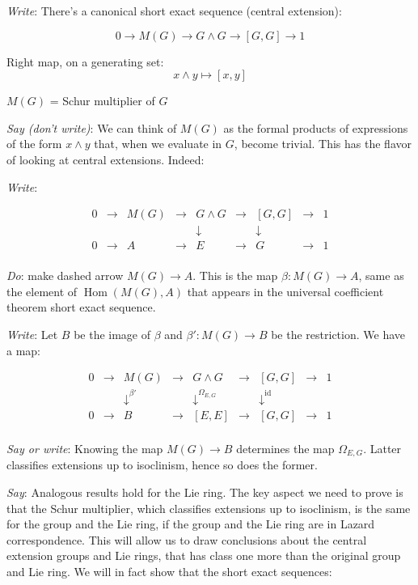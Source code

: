 \documentclass[10pt]{amsart}
\begin{document}
{\em Write}: There's a canonical short exact sequence (central extension):

$$0 \to M(G) \to G \wedge G \to [G,G] \to 1$$

Right map, on a generating set: $$x \wedge y \mapsto [x,y]$$

$M(G)$ = Schur multiplier of $G$

{\em Say (don't write)}: We can think of $M(G)$ as the formal products
of expressions of the form $x \wedge y$ that, when we evaluate in $G$,
become trivial. This has the flavor of looking at central extensions. Indeed:

{\em Write}: 

$$\begin{array}{ccccccccc}
0 & \to & M(G) & \to & G \wedge G & \to & [G,G] & \to & 1\\
 &&               && \downarrow     &&\downarrow&& \\
0 & \to & A & \to & E & \to & G & \to & 1\\
\end{array}$$

{\em Do}: make dashed arrow $M(G) \to A$.  This is the map $\beta:M(G)
\to A$, same as the element of $\operatorname{Hom}(M(G),A)$ that
appears in the universal coefficient theorem short exact sequence.

{\em Write}: Let $B$ be the image of $\beta$ and $\beta': M(G) \to B$
be the restriction. We have a map:

$$\begin{array}{ccccccccc}
0 & \to & M(G) & \to & G \wedge G & \to & [G,G] & \to & 1\\
 &&   \downarrow^{\beta'}  &&  \downarrow^{\Omega_{E,G}}     && \downarrow^{\text{id}} && \\
0 & \to & B &\to & [E,E] & \to & [G,G] & \to & 1\\
\end{array}$$

{\em Say or write}: Knowing the map $M(G) \to B$ determines the map
$\Omega_{E,G}$. Latter classifies extensions up to isoclinism, hence
so does the former.

{\em Say}: Analogous results hold for the Lie ring. The key aspect we
need to prove is that the Schur multiplier, which classifies
extensions up to isoclinism, is the same for the group and the Lie
ring, if the group and the Lie ring are in Lazard correspondence. This
will allow us to draw conclusions about the central extension groups
and Lie rings, that has class one more than the original group and Lie
ring. We will in fact show that the short exact sequences:
\end{document}
